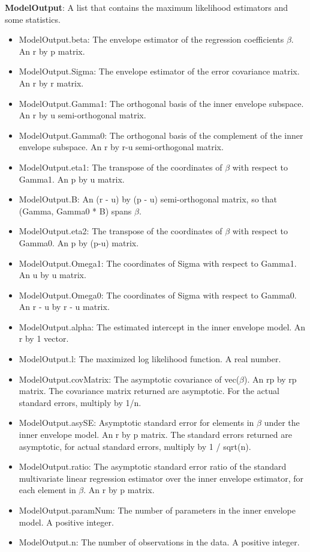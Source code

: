 \documentclass[a4paper,11pt,openany]{memoir}
\begin{document}
\begin{par}
\textbf{ModelOutput}: A list that contains the maximum likelihood estimators and some statistics.
\end{par} \vspace{1em}
\begin{itemize}
\setlength{\itemsep}{-1ex}
   \item ModelOutput.beta: The envelope estimator of the regression coefficients $\beta$. An r by p matrix.
   \item ModelOutput.Sigma: The envelope estimator of the error covariance matrix.  An r by r matrix.
   \item ModelOutput.Gamma1: The orthogonal basis of the inner envelope subspace. An r by u semi-orthogonal matrix.
   \item ModelOutput.Gamma0: The orthogonal basis of the complement of the inner envelope subspace.  An r by r-u semi-orthogonal matrix.
   \item ModelOutput.eta1: The transpose of the coordinates of $\beta$ with respect to Gamma1. An p by u matrix.
   \item ModelOutput.B: An (r - u) by (p - u) semi-orthogonal matrix, so that (Gamma, Gamma0 * B) spans $\beta$.
   \item ModelOutput.eta2: The transpose of the coordinates of $\beta$ with respect to Gamma0. An p by (p-u) matrix.
   \item ModelOutput.Omega1: The coordinates of Sigma with respect to Gamma1. An u by u matrix.
   \item ModelOutput.Omega0: The coordinates of Sigma with respect to Gamma0. An r - u by r - u matrix.
   \item ModelOutput.alpha: The estimated intercept in the inner envelope model.  An r by 1 vector.
   \item ModelOutput.l: The maximized log likelihood function.  A real number.
   \item ModelOutput.covMatrix: The asymptotic covariance of vec($\beta$).  An rp by rp matrix.  The covariance matrix returned are asymptotic.  For the actual standard errors, multiply by 1/n.
   \item ModelOutput.asySE: Asymptotic standard error for elements in $\beta$ under the inner envelope model.  An r by p matrix.  The standard errors returned are asymptotic, for actual standard errors, multiply by 1 / sqrt(n).
   \item ModelOutput.ratio: The asymptotic standard error ratio of the standard multivariate linear regression estimator over the inner envelope estimator, for each element in $\beta$.  An r by p matrix.
   \item ModelOutput.paramNum: The number of parameters in the inner envelope model.  A positive integer.
   \item ModelOutput.n: The number of observations in the data.  A positive integer.
\end{itemize}
\end{document}
